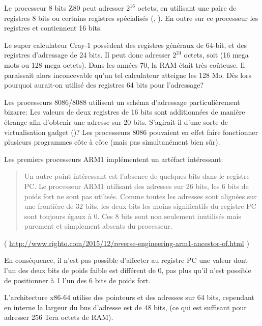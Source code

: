 Le processeur 8 bits Z80 peut adresser $2^{16}$ octets, en utilisant une paire de registres 8 bits ou certains registres
spécialisés (, ). En outre sur ce processeur les registres  et  contiennent 16 bits.

Le super calculateur Cray-1 possèdent des registres généraux de 64-bit, et des registres d'adressage de 24 bits.
Il peut donc adresser $2^{24}$ octets, soit (16 mega mots ou 128 mega octets).
Dans les années 70, la RAM était très coûteuse. Il paraissait alors inconcevable qu'un tel calculateur atteigne
les 128 Mo. Dès lors pourquoi aurait-on utilisé des registres 64 bits pour l'adressage?

Les processeurs 8086/8088 utilisent un schéma d'adressage particulièrement bizarre:
Les valeurs de deux registres de 16 bits sont additionnées de manière étrange afin d'obtenir une adresse sur 20 bits.
S'agirait-il d'une sorte de virtualisation gadget ()?
Les processeurs 8086 pouvaient en effet faire fonctionner plusieurs programmes côte à côte (mais pas simultanément bien sûr).

Les premiers processeurs ARM1 implémentent un artéfact intéressant:

\begin{framed}
\begin{quotation}
Un autre point intéressant est l'absence de quelques bits dans le registre PC. Le processeur ARM1 utilisant des adresses
sur 26 bits, les 6 bits de poids fort ne sont pas utilisés. Comme toutes les adresses sont alignées sur une frontière de
32 bits, les deux bits les moins significatifs du registre PC sont toujours égaux à 0. Ces 8 bits sont non seulement
inutilisés mais purement et simplement absents du processeur.
\end{quotation}
\end{framed}

( \url{http://www.righto.com/2015/12/reverse-engineering-arm1-ancestor-of.html} )

En conséquence, il n'est pas possible d'affecter au registre PC une valeur dont l'un des deux bits de poids faible est
différent de 0, pas plus qu'il n'est possible de positionner à 1 l'un des 6 bits de poids fort.

L'architecture x86-64 utilise des pointeurs et des adresses sur 64 bits, cependant en interne la largeur du bus
d'adresse est de 48 bits, (ce qui est suffisant pour adresser 256 Tera octets de \ac{RAM}).

